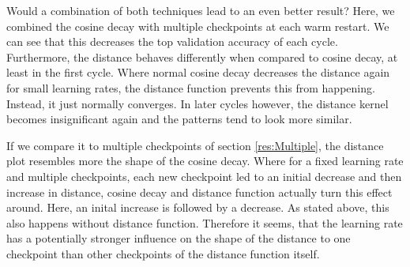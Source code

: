 Would a combination of both techniques lead to an even better result? Here, we
combined the cosine decay with multiple checkpoints at each warm restart. We can
see that this decreases the top validation accuracy of each cycle. Furthermore,
the distance behaves differently when compared to cosine decay, at least in the
first cycle. Where normal cosine decay decreases the distance again for small
learning rates, the distance function prevents this from happening. Instead, it
just normally converges. In later cycles however, the distance kernel becomes
insignificant again and the patterns tend to look more similar.

If we compare it to multiple checkpoints of section \ref{res:Multiple}, the
distance plot resembles more the shape of the cosine decay. Where for a fixed
learning rate and multiple checkpoints, each new checkpoint led to an initial
decrease and then increase in distance, cosine decay and distance function
actually turn this effect around. Here, an inital increase is followed by a
decrease. As stated above, this also happens without distance function.
Therefore it seems, that the learning rate has a potentially stronger influence
on the shape of the distance to one checkpoint than other checkpoints of the
distance function itself.

